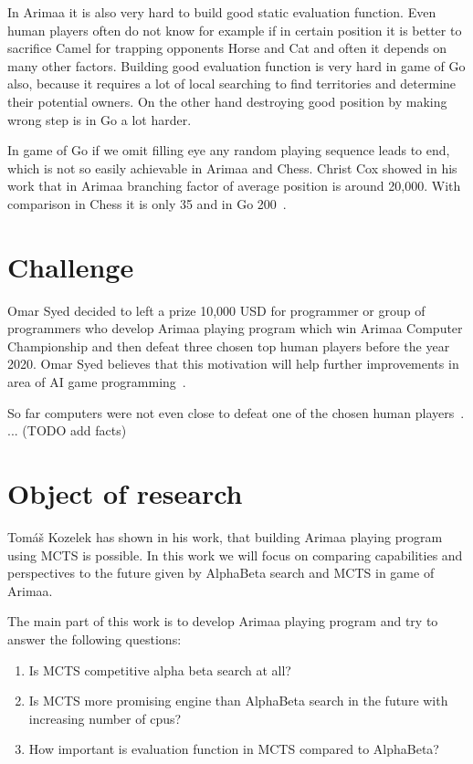 In Arimaa it is also very hard to build good static evaluation function. Even
human players often do not know for example if in certain position it is better
to sacrifice Camel for trapping opponents Horse and Cat and often it depends on
many other factors. Building good evaluation function is very hard in game of
Go also, because it requires a lot of local searching to find territories and
determine their potential owners. On the other hand destroying good position by
making wrong step is in Go a lot harder.

In game of Go if we omit filling eye any random playing sequence leads to end,
which is not so easily achievable in Arimaa and Chess. Christ Cox showed in his
work that in Arimaa branching factor of average position is around 20,000. With
comparison in Chess it is only 35 and in Go 200~\cite{COX}.


\section{Challenge}
Omar Syed decided to left a prize 10,000 USD for programmer or group of
programmers who develop Arimaa playing program which win Arimaa Computer
Championship and then defeat three chosen top human players before the year
2020. Omar Syed believes that this motivation will help further improvements in
area of AI game programming~\cite{syed}.

So far computers were not even close to defeat one of the chosen human
players~\cite{arimaa.com}. ... (TODO add facts)

\section{Object of research}
Tomáš Kozelek has shown in his work, that building Arimaa playing program using
MCTS is possible. In this work we will focus on comparing capabilities and
perspectives to the future given by AlphaBeta search and MCTS in game of
Arimaa.

The main part of this work is to develop Arimaa playing program and try to
answer the following questions:

\begin{enumerate}
\item Is MCTS competitive alpha beta search at all?
\item Is MCTS more promising engine than AlphaBeta search in the future with
      increasing number of cpus?
\item How important is evaluation function in MCTS compared to AlphaBeta?
\end{enumerate}
